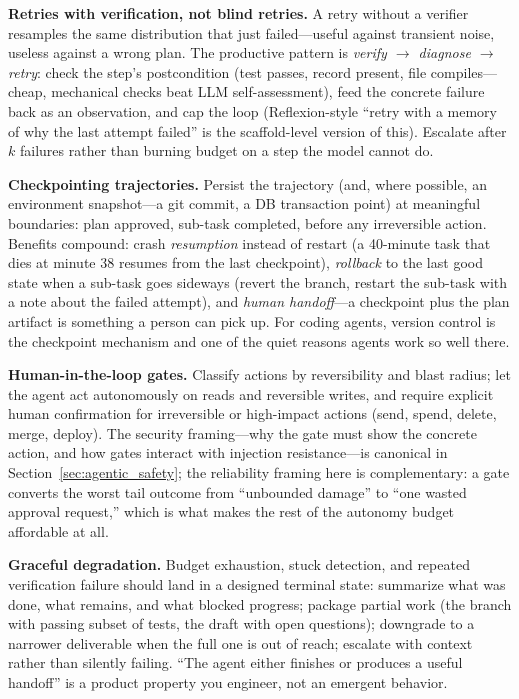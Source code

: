 \textbf{Retries with verification, not blind retries.} A retry without a verifier resamples the same distribution that just failed---useful against transient noise, useless against a wrong plan. The productive pattern is \textit{verify $\rightarrow$ diagnose $\rightarrow$ retry}: check the step's postcondition (test passes, record present, file compiles---cheap, mechanical checks beat LLM self-assessment), feed the concrete failure back as an observation, and cap the loop (Reflexion-style ``retry with a memory of why the last attempt failed'' is the scaffold-level version of this). Escalate after $k$ failures rather than burning budget on a step the model cannot do.

\textbf{Checkpointing trajectories.} Persist the trajectory (and, where possible, an environment snapshot---a git commit, a DB transaction point) at meaningful boundaries: plan approved, sub-task completed, before any irreversible action. Benefits compound: crash \textit{resumption} instead of restart (a 40-minute task that dies at minute 38 resumes from the last checkpoint), \textit{rollback} to the last good state when a sub-task goes sideways (revert the branch, restart the sub-task with a note about the failed attempt), and \textit{human handoff}---a checkpoint plus the plan artifact is something a person can pick up. For coding agents, version control is the checkpoint mechanism and one of the quiet reasons agents work so well there.

\textbf{Human-in-the-loop gates.} Classify actions by reversibility and blast radius; let the agent act autonomously on reads and reversible writes, and require explicit human confirmation for irreversible or high-impact actions (send, spend, delete, merge, deploy). The security framing---why the gate must show the concrete action, and how gates interact with injection resistance---is canonical in Section~\ref{sec:agentic_safety}; the reliability framing here is complementary: a gate converts the worst tail outcome from ``unbounded damage'' to ``one wasted approval request,'' which is what makes the rest of the autonomy budget affordable at all.

\textbf{Graceful degradation.} Budget exhaustion, stuck detection, and repeated verification failure should land in a designed terminal state: summarize what was done, what remains, and what blocked progress; package partial work (the branch with passing subset of tests, the draft with open questions); downgrade to a narrower deliverable when the full one is out of reach; escalate with context rather than silently failing. ``The agent either finishes or produces a useful handoff'' is a product property you engineer, not an emergent behavior.

